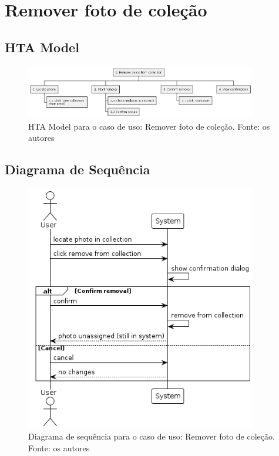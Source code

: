 \section{Remover foto de coleção}

\subsection{HTA Model}

\begin{figure}[H]
    \centering
    \includegraphics[width=0.9\textwidth]{../figures/hta/UC004.png}
    \caption{HTA Model para o caso de uso: Remover foto de coleção. Fonte: os autores}
    \label{fig:hta-uc004}
\end{figure}

\subsection{Diagrama de Sequência}

\begin{figure}[H]
    \centering
    \includegraphics[width=0.9\textwidth]{../figures/dss/UC004.png}
    \caption{Diagrama de sequência para o caso de uso: Remover foto de coleção. Fonte: os autores}
    \label{fig:dss-uc004}
\end{figure}

